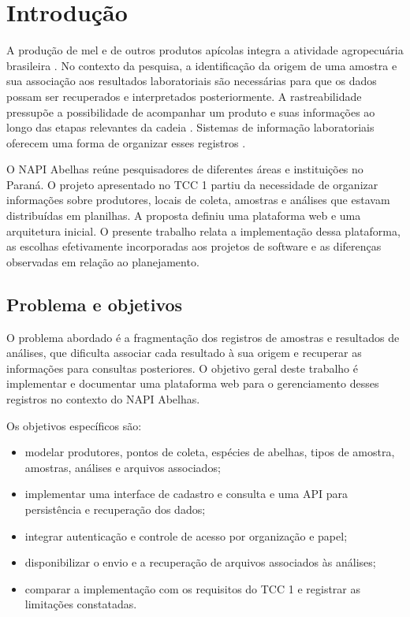 \chapter{Introdução}
\label{chap:introducao}

A produção de mel e de outros produtos apícolas integra a atividade agropecuária brasileira \cite{ibge2024}. No contexto da pesquisa, a identificação da origem de uma amostra e sua associação aos resultados laboratoriais são necessárias para que os dados possam ser recuperados e interpretados posteriormente. A rastreabilidade pressupõe a possibilidade de acompanhar um produto e suas informações ao longo das etapas relevantes da cadeia \cite{iso22005}. Sistemas de informação laboratoriais oferecem uma forma de organizar esses registros \cite{gibbon1996}.

O NAPI Abelhas reúne pesquisadores de diferentes áreas e instituições no Paraná. O projeto apresentado no TCC 1 partiu da necessidade de organizar informações sobre produtores, locais de coleta, amostras e análises que estavam distribuídas em planilhas. A proposta definiu uma plataforma web e uma arquitetura inicial. O presente trabalho relata a implementação dessa plataforma, as escolhas efetivamente incorporadas aos projetos de software e as diferenças observadas em relação ao planejamento.

\section{Problema e objetivos}
\label{sec:objetivos}

O problema abordado é a fragmentação dos registros de amostras e resultados de análises, que dificulta associar cada resultado à sua origem e recuperar as informações para consultas posteriores. O objetivo geral deste trabalho é implementar e documentar uma plataforma web para o gerenciamento desses registros no contexto do NAPI Abelhas.

Os objetivos específicos são:
\begin{itemize}
    \item modelar produtores, pontos de coleta, espécies de abelhas, tipos de amostra, amostras, análises e arquivos associados;
    \item implementar uma interface de cadastro e consulta e uma API para persistência e recuperação dos dados;
    \item integrar autenticação e controle de acesso por organização e papel;
    \item disponibilizar o envio e a recuperação de arquivos associados às análises;
    \item comparar a implementação com os requisitos do TCC 1 e registrar as limitações constatadas.
\end{itemize}


